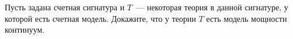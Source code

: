 Пусть задана счетная сигнатура и $T$~--- некоторая теория в данной сигнатуре, у которой есть счетная модель. Докажите, что у
теории $T$ есть модель мощности континуум.